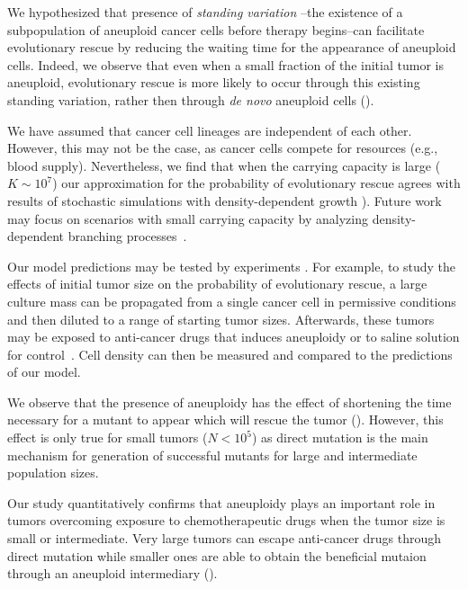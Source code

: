 \documentclass[12pt]{extarticle}
\begin{document}
We hypothesized that presence of \emph{standing variation} %
--the existence of a subpopulation of aneuploid cancer cells before therapy begins--can facilitate evolutionary rescue by reducing the waiting time for the appearance of aneuploid cells. Indeed, we observe that even when a small fraction of the initial tumor is aneuploid, evolutionary rescue is more likely to occur through this existing standing variation, rather then through \emph{de novo} aneuploid cells ().

We have assumed that cancer cell lineages are independent of each other. However, this may not be the case, as cancer cells compete for resources (e.g., blood supply). Nevertheless, we find that when the carrying capacity is large ($K\sim10^7$) %
our approximation for the probability of evolutionary rescue agrees with results of stochastic simulations with density-dependent growth  ).
Future work may focus on scenarios with small carrying capacity by analyzing density-dependent branching processes~\citep{klebaner1997population}. %

Our model predictions may be tested by experiments \citep{martin2013probability}. For example, to study the effects of initial tumor size on the probability of evolutionary rescue, a large culture mass can be propagated from a single cancer cell in permissive conditions and then diluted to a  range of starting tumor sizes. Afterwards, these tumors may be exposed to anti-cancer drugs that induces aneuploidy %
or to saline solution for control~\citep{ippolito2021gene}. 
Cell density can then be measured and compared to the predictions of our model. %

We observe that the presence of aneuploidy has the effect of shortening the time necessary for a mutant to appear which will rescue the tumor (). However, this effect is only true for small tumors ($N<10^5$) as direct mutation is the main mechanism for generation of successful mutants for large and intermediate population sizes.

Our study quantitatively confirms that aneuploidy plays an important role in tumors overcoming exposure to chemotherapeutic drugs when the tumor size is small or intermediate. Very large tumors can escape anti-cancer drugs through direct mutation while smaller ones are able to obtain the beneficial mutaion through an aneuploid intermediary ().
\end{document}
